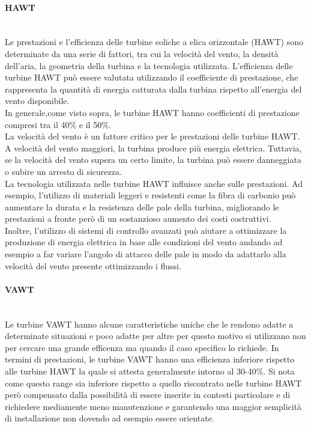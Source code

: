 \paragraph{HAWT}\mbox{}\\
Le prestazioni e l'efficienza delle turbine eoliche a elica orizzontale (HAWT) sono determinate da una serie di fattori, tra cui la velocità del vento, la densità dell'aria, la geometria della turbina e la tecnologia utilizzata.
L'efficienza delle turbine HAWT può essere valutata utilizzando il coefficiente di prestazione, che rappresenta la quantità di energia catturata dalla turbina rispetto all'energia del vento disponibile.\\
In generale,come visto sopra, le turbine HAWT hanno coefficienti di prestazione compresi tra il 40\% e il 50\%.\\
La velocità del vento è un fattore critico per le prestazioni delle turbine HAWT. A velocità del vento maggiori, la turbina produce più energia elettrica. Tuttavia, se la velocità del vento supera un certo limite, la turbina può essere danneggiata o subire un arresto di sicurezza.\\
La tecnologia utilizzata nelle turbine HAWT influisce anche sulle prestazioni. Ad esempio, l'utilizzo di materiali leggeri e resistenti come la fibra di carbonio può aumentare la durata e la resistenza delle pale della turbina, migliorando le prestazioni a fronte però di un sostanzioso aumento dei costi costruttivi.\\
Inoltre, l'utilizzo di sistemi di controllo avanzati può aiutare a ottimizzare la produzione di energia elettrica in base alle condizioni del vento andando ad esempio a far variare l'angolo di attacco delle pale in modo da adattarlo alla velocità del vento presente ottimizzando i flussi.
\paragraph{VAWT}\mbox{}\\
Le turbine VAWT hanno alcune caratteristiche uniche che le rendono adatte a determinate situazioni e poco adatte per altre per questo motivo si utilizzano non per cercare una grande efficenza ma quando il caso specifico lo richiede.
In termini di prestazioni, le turbine VAWT hanno una efficienza inferiore rispetto alle turbine HAWT la quale si attesta generalmente intorno al 30-40\%.
Si nota come questo range sia inferiore rispetto a quello riscontrato nelle turbine HAWT però compensato dalla possibilità di essere inserite in contesti particolare e di richiedere mediamente meno manutenzione e garantendo una maggior semplicità di installazione non dovendo ad esempio essere orientate.
\newpage

